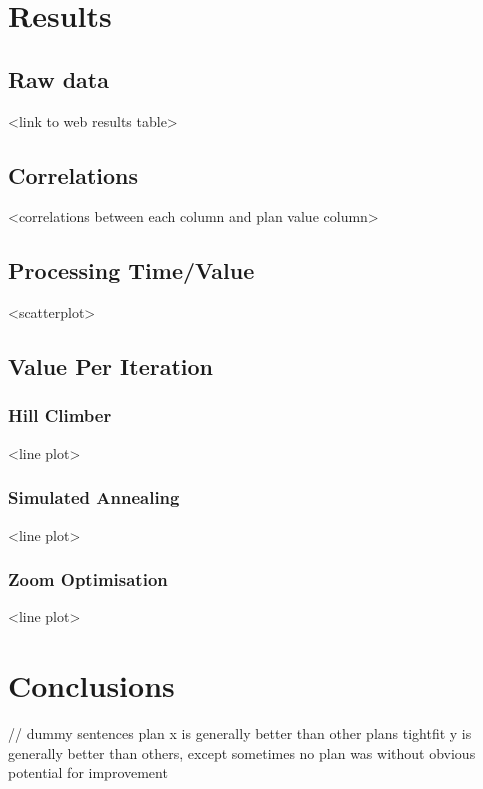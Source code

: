 \documentclass{article}
\begin{document}
\section{Results}

\subsection{Raw data}

<link to web results table>

\subsection{Correlations}

<correlations between each column and plan value column>

\subsection{Processing Time/Value}

<scatterplot>

\subsection{Value Per Iteration}

\subsubsection{Hill Climber}

<line plot>

\subsubsection{Simulated Annealing}

<line plot>

\subsubsection{Zoom Optimisation}

<line plot>

\section{Conclusions}

// dummy sentences
plan x is generally better than other plans
tightfit y is generally better than others, except sometimes
no plan was without obvious potential for improvement
\end{document}
